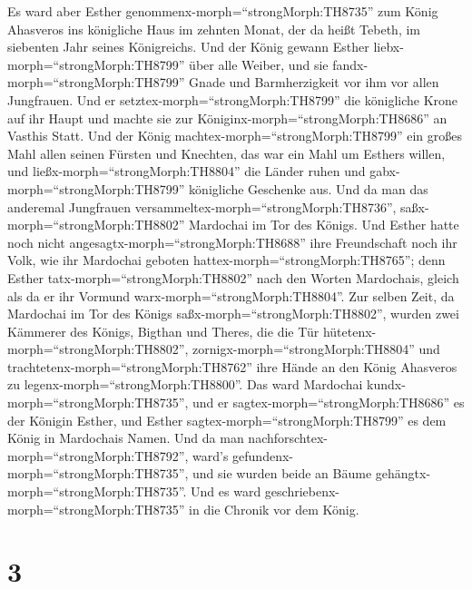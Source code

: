 Es ward aber Esther genommenx-morph=``strongMorph:TH8735'' zum König
Ahasveros ins königliche Haus im zehnten Monat, der da heißt Tebeth, im
siebenten Jahr seines Königreichs.  Und der König gewann
Esther liebx-morph=``strongMorph:TH8799'' über alle Weiber, und sie
fandx-morph=``strongMorph:TH8799'' Gnade und Barmherzigkeit vor ihm vor
allen Jungfrauen. Und er setztex-morph=``strongMorph:TH8799'' die
königliche Krone auf ihr Haupt und machte sie zur
Königinx-morph=``strongMorph:TH8686'' an Vasthis Statt. 
Und der König machtex-morph=``strongMorph:TH8799'' ein großes Mahl allen
seinen Fürsten und Knechten, das war ein Mahl um Esthers willen, und
ließx-morph=``strongMorph:TH8804'' die Länder ruhen und
gabx-morph=``strongMorph:TH8799'' königliche Geschenke aus.
 Und da man das anderemal Jungfrauen
versammeltex-morph=``strongMorph:TH8736'',
saßx-morph=``strongMorph:TH8802'' Mardochai im Tor des Königs.
 Und Esther hatte noch nicht
angesagtx-morph=``strongMorph:TH8688'' ihre Freundschaft noch ihr Volk,
wie ihr Mardochai geboten hattex-morph=``strongMorph:TH8765''; denn
Esther tatx-morph=``strongMorph:TH8802'' nach den Worten Mardochais,
gleich als da er ihr Vormund warx-morph=``strongMorph:TH8804''.
 Zur selben Zeit, da Mardochai im Tor des Königs
saßx-morph=``strongMorph:TH8802'', wurden zwei Kämmerer des Königs,
Bigthan und Theres, die die Tür hütetenx-morph=``strongMorph:TH8802'',
zornigx-morph=``strongMorph:TH8804'' und
trachtetenx-morph=``strongMorph:TH8762'' ihre Hände an den König
Ahasveros zu legenx-morph=``strongMorph:TH8800''.  Das ward
Mardochai kundx-morph=``strongMorph:TH8735'', und er
sagtex-morph=``strongMorph:TH8686'' es der Königin Esther, und Esther
sagtex-morph=``strongMorph:TH8799'' es dem König in Mardochais Namen.
 Und da man nachforschtex-morph=``strongMorph:TH8792'',
ward's gefundenx-morph=``strongMorph:TH8735'', und sie wurden beide an
Bäume gehängtx-morph=``strongMorph:TH8735''. Und es ward
geschriebenx-morph=``strongMorph:TH8735'' in die Chronik vor dem König.

\hypertarget{section-2}{%
\section{3}\label{section-2}}

